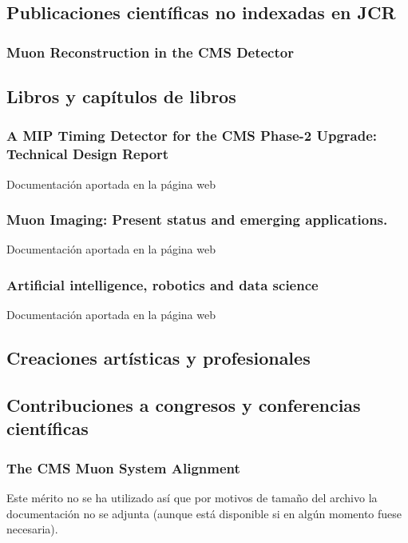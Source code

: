 \documentclass[a4paper, 11pt, twoside, openright]{report}
\begin{document}
\subsection{Publicaciones científicas no indexadas en JCR}

\subsubsection{Muon Reconstruction in the CMS Detector}


\subsection{Libros y capítulos de libros}
\subsubsection{A MIP Timing Detector for the CMS Phase-2 Upgrade: Technical Design Report}
%
Documentación aportada en la página web

\subsubsection{Muon Imaging: Present status and emerging applications.}
%
Documentación aportada en la página web

\subsubsection{Artificial intelligence, robotics and data science}
%
Documentación aportada en la página web


\subsection{Creaciones artísticas y profesionales}

\subsection{Contribuciones a congresos y conferencias científicas}

\subsubsection{The CMS Muon System Alignment}
%
Este mérito no se ha utilizado así que por motivos de tamaño del archivo la documentación no se adjunta (aunque está disponible si en algún momento fuese necesaria).
\end{document}
